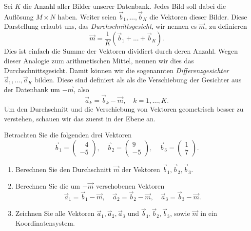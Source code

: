 Sei $K$ die Anzahl aller Bilder unserer Datenbank.
Jedes Bild soll dabei die Auflösung $M\times N$ haben.
Weiter seien $\vec b_1,\ldots,\vec b_K$ die Vektoren dieser Bilder.
Diese Darstellung erlaubt uns, das \textit{Durchschnittsgesicht}, wir nennen es $\vec m$, zu definieren
\begin{equation*}
	\vec m=\frac{1}{K}\left(\vec b_1+\ldots+\vec b_K\right).
\end{equation*}
Dies ist einfach die Summe der Vektoren dividiert durch deren Anzahl.
Wegen dieser Analogie zum arithmetischen Mittel, nennen wir dies das Durchschnittsgesicht.
Damit können wir die sogenannten \textit{Differenzgesichter} $\vec a_1,\ldots,\vec a_K$ bilden.
Diese sind definiert als als die Verschiebung der Gesichter aus der Datenbank um $-\vec{m}$, also
\begin{equation*}
	\vec a_k=\vec b_k-\vec m,\quad k=1,\ldots,K.
\end{equation*}
Um den Durchschnitt und die Verschiebung von Vektoren geometrisch besser zu verstehen, schauen wir das zuerst in der Ebene an.
\begin{aufgabe} \label{aufg:meandiff_simple}
	Betrachten Sie die folgenden drei Vektoren
	\begin{equation*}
		\vec{b}_1=
		\begin{pmatrix}
			-4 \\
			-5
		\end{pmatrix},\quad
		\vec{b}_2=
		\begin{pmatrix}
			9 \\
			-5
		\end{pmatrix},\quad
		\vec{b}_3=
		\begin{pmatrix}
			1 \\
			7
		\end{pmatrix}.
	\end{equation*}
	\begin{enumerate}[label=(\alph*)]
		\item Berechnen Sie den Durchschnitt $\vec{m}$ der Vektoren $\vec{b}_1,\vec{b}_2,\vec{b}_3$.
		\item \label{item:difference_faces} Berechnen Sie die um $-\vec{m}$ verschobenen Vektoren
		\begin{equation*}
			\vec{a}_1=\vec{b}_1-\vec{m},\quad
			\vec{a}_2=\vec{b}_2-\vec{m},\quad
			\vec{a}_3=\vec{b}_3-\vec{m}.
		\end{equation*}
		\item Zeichnen Sie alle Vektoren $\vec{a}_1,\vec{a}_2,\vec{a}_3$ und $\vec{b}_1,\vec{b}_2,\vec{b}_3$, sowie $\vec{m}$ in ein Koordinatensystem.
	\end{enumerate}
\end{aufgabe}
